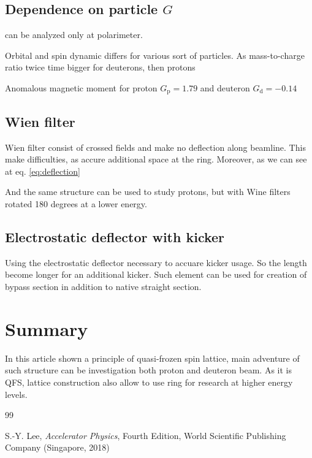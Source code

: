 \documentclass[submitting]{nst}
\begin{document}
\subsection{Dependence on particle $G$}

can be analyzed only at polarimeter.

Orbital and spin dynamic differs for various sort of particles. As mass-to-charge ratio twice time bigger for deuterons, then protons

Anomalous magnetic moment for proton $G_{\text{p}} = 1.79$ and deuteron $G_{\text{d}} = -0.14$ 

\subsection{Wien filter}

\par Wien filter consist of crossed fields and make no deflection along beamline. This make difficulties, as accure additional space at the ring. Moreover, as we can see at eq. \ref{eq:deflection}

\par And the same structure can be used to study protons, but with Wine filters rotated 180 degrees at a lower energy.

\subsection{Electrostatic deflector with kicker}

\par Using the electrostatic deflector necessary to accuare kicker usage. So the length become longer for an additional kicker. Such element can be used for creation of bypass section in addition to native straight section. 

\section{Summary} \label{sec.IV}

\par In this article shown a principle of quasi-frozen spin lattice, main adventure of such structure can be investigation both proton and deuteron beam. As it is QFS, lattice construction also allow to use ring for research at higher energy levels.

\begin{thebibliography} {99}

		S.-Y. Lee, {\it Accelerator Physics}, Fourth Edition, World Scientific Publishing Company (Singapore, 2018)


\end{thebibliography}
\end{document}

